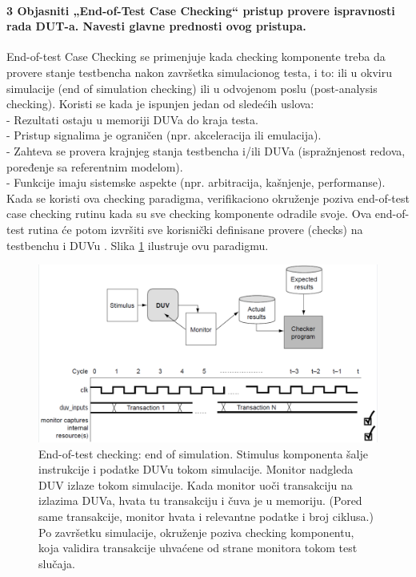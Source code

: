 \documentclass[a4paper, 12pt]{article}
\begin{document}
\paragraph{3 Objasniti „End-of-Test Case Checking“ pristup provere ispravnosti rada DUT-a. Navesti glavne prednosti ovog pristupa.}
\hfill \break
\indent End-of-test Case Checking se primenjuje kada checking komponente treba da provere stanje testbencha nakon završetka simulacionog testa, i to: ili u okviru simulacije (end of simulation checking) ili u odvojenom poslu (post-analysis checking). Koristi se kada je ispunjen jedan od sledećih uslova: \\
- Rezultati ostaju u memoriji DUVa do kraja testa.\\
- Pristup signalima je ograničen (npr. akceleracija ili emulacija).\\
- Zahteva se provera krajnjeg stanja testbencha i/ili DUVa (ispražnjenost redova, poređenje sa referentnim modelom).\\
- Funkcije imaju sistemske aspekte (npr. arbitracija, kašnjenje, performanse).\\
\indent 
Kada se koristi ova checking paradigma, verifikaciono okruženje poziva end-of-test case checking rutinu kada su sve checking komponente odradile svoje. Ova end-of-test rutina će potom izvršiti sve korisnički definisane provere (checks) na testbenchu i DUVu . Slika \ref{img2} ilustruje ovu paradigmu.
\begin{figure}[h!]
\centering
\includegraphics[scale=1]{img2.png}
\caption{End-of-test checking: end of simulation. Stimulus komponenta šalje instrukcije i podatke DUVu tokom simulacije. Monitor nadgleda DUV izlaze tokom simulacije. Kada monitor uoči transakciju na izlazima DUVa, hvata tu transakciju i čuva je u memoriju. (Pored same transakcije, monitor hvata i relevantne podatke i broj ciklusa.) Po završetku simulacije, okruženje poziva checking komponentu, koja validira transakcije uhvaćene od strane monitora tokom test slučaja.}
\label{img2}
\end{figure} 
\end{document}
